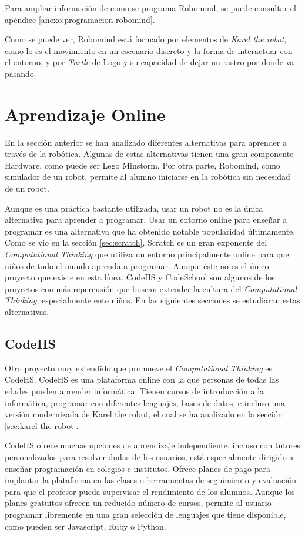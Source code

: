 {\color{blue}
Para ampliar información de como se programa Robomind, se puede consultar el apéndice \ref{anexo:programacion-robomind}.

Como se puede ver, Robomind está formado por elementos de \emph{Karel the robot}, como lo es el movimiento en un escenario discreto y la forma de interactuar con el entorno, y por \emph{Turtle} de Logo y su capacidad de dejar un rastro por donde va pasando.
}


\section{Aprendizaje Online}
\label{sec:aprendiendo-online}

En la sección anterior se han analizado diferentes alternativas para aprender a través de la robótica. Algunas de estas alternativas tienen una gran componente Hardware, como puede ser Lego Minstorm. Por otra parte, Robomind, como simulador de un robot, permite al alumno iniciarse en la robótica sin necesidad  de un robot. 

Aunque es una práctica bastante utilizada, usar un robot no es la única alternativa para aprender a programar. Usar un entorno online para enseñar a programar es una alternativa que ha obtenido notable popularidad últimamente. Como se vio en la sección \ref{sec:scratch}, Scratch es un gran exponente del \emph{Computational Thinking} que utiliza un entorno principalmente online para que niños de todo el mundo aprenda a programar. Aunque éste no es el único proyecto que existe en esta línea. CodeHS y CodeSchool son algunos de los proyectos con más repercusión que buscan extender la cultura del \emph{Computational Thinking}, especialmente ente niños. En las siguientes secciones se estudiaran estas alternativas.

\subsection{CodeHS}
\label{sec:CodeHS}


Otro proyecto muy extendido que promueve el \emph{Computational Thinking} es CodeHS. CodeHS es una plataforma online con la que personas de todas las edades pueden aprender informática. Tienen cursos de introducción a la informática, programar con diferentes lenguajes, bases de datos, e incluso una versión modernizada de Karel the robot, el cual se ha analizado en la sección \ref{sec:karel-the-robot}.

CodeHS ofrece muchas opciones de aprendizaje independiente, incluso con tutores personalizados para resolver dudas de los usuarios, está especialmente dirigido a enseñar programación en colegios e institutos. Ofrece planes de pago para implantar la plataforma en las clases o herramientas de seguimiento y evaluación para que el profesor pueda supervisar el rendimiento de los alumnos. Aunque los planes gratuitos ofrecen un reducido número de cursos, permite al usuario programar libremente en una gran selección de lenguajes que tiene disponible, como pueden ser Javascript, Ruby o Python.


